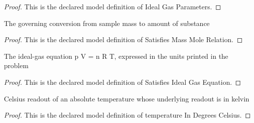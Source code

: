 \begin{proof}
  This is the declared model definition of Ideal Gas Parameters.
\end{proof}
\begin{definition}
  \label{def:physics:phyx-mini-0372:phyxmini0372-satisfiesmassmolerelation}
  The governing conversion from sample mass to amount of substance
\end{definition}
\begin{proof}
  This is the declared model definition of Satisfies Mass Mole Relation.
\end{proof}
\begin{definition}
  \label{def:physics:phyx-mini-0372:phyxmini0372-satisfiesidealgasequation}
  The ideal-gas equation p V = n R T, expressed in the units printed in the problem
\end{definition}
\begin{proof}
  This is the declared model definition of Satisfies Ideal Gas Equation.
\end{proof}
\begin{definition}
  \label{def:physics:phyx-mini-0372:phyxmini0372-temperatureindegreescelsius}
  Celsius readout of an absolute temperature whose underlying readout is in kelvin
\end{definition}
\begin{proof}
  This is the declared model definition of temperature In Degrees Celsius.
\end{proof}
